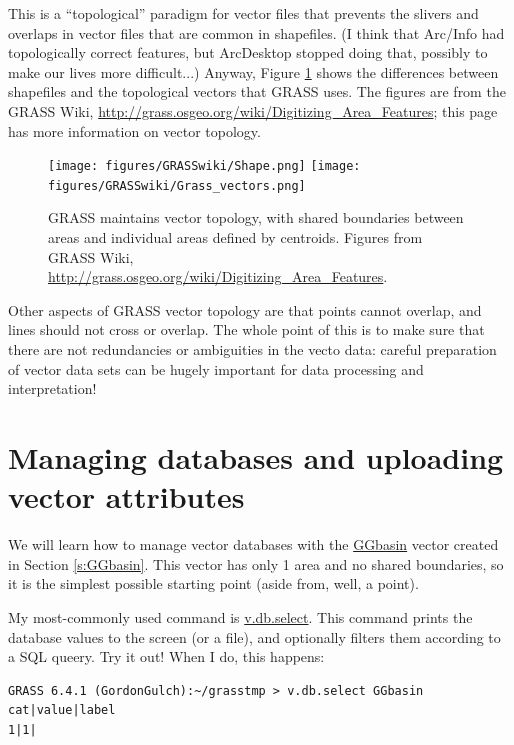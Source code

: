 \documentclass{book}
\begin{document}
This is a ``topological'' paradigm for vector files that prevents the slivers and overlaps in vector files that are common in shapefiles. (I think that Arc/Info had topologically correct features, but ArcDesktop stopped doing that, possibly to make our lives more difficult...) Anyway, Figure \ref{fig:vector_paradigms} shows the differences between shapefiles and the topological vectors that GRASS uses. The figures are from the GRASS Wiki, \url{http://grass.osgeo.org/wiki/Digitizing_Area_Features}; this page has more information on vector topology.

\begin{figure}[h]
 \begin{center}
 \texttt{[image: figures/GRASSwiki/Shape.png]}
 \texttt{[image: figures/GRASSwiki/Grass\_vectors.png]}
 \caption{GRASS maintains vector topology, with shared boundaries between areas and individual areas defined by centroids. Figures from GRASS Wiki, \protect\url{http://grass.osgeo.org/wiki/Digitizing_Area_Features}.}
 \label{fig:vector_paradigms}
 \end{center}
\end{figure}

Other aspects of GRASS vector topology are that points cannot overlap, and lines should not cross or overlap. The whole point of this is to make sure that there are not redundancies or ambiguities in the vecto data: careful preparation of vector data sets can be hugely important for data processing and interpretation!

\section{Managing databases and uploading vector attributes}

We will learn how to manage vector databases with the \url{GGbasin} vector created in Section \ref{s:GGbasin}. This vector has only 1 area and no shared boundaries, so it is the simplest possible starting point (aside from, well, a point).

My most-commonly used command is \url{v.db.select}. This command prints the database values to the screen (or a file), and optionally filters them according to a SQL queery. Try it out! When I do, this happens:

\begin{lstlisting}
GRASS 6.4.1 (GordonGulch):~/grasstmp > v.db.select GGbasin
cat|value|label
1|1|
\end{lstlisting}
\end{document}
